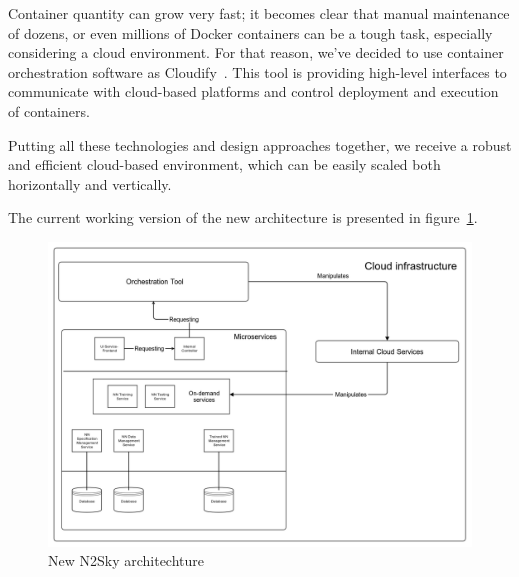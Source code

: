 \documentclass[conference]{IEEEtran}
\begin{document}
Container quantity can grow very fast; it becomes clear that manual maintenance of dozens, or even millions of Docker containers can be a tough task, especially considering a cloud environment. For that reason, we’ve decided to use container orchestration software as Cloudify~\cite{cloudify}. This tool is providing high-level interfaces to communicate with cloud-based platforms and control deployment and execution of containers.

Putting all these technologies and design approaches together, we receive a robust and efficient cloud-based environment, which can be easily scaled both horizontally and vertically.

The current working version of the new architecture is presented in figure~\ref{fig:arch}.

\begin{figure}[H]
  \includegraphics[width=\linewidth]{architecture.png}
  \caption{New N2Sky architechture}
  \label{fig:arch}
\end{figure}
\end{document}

